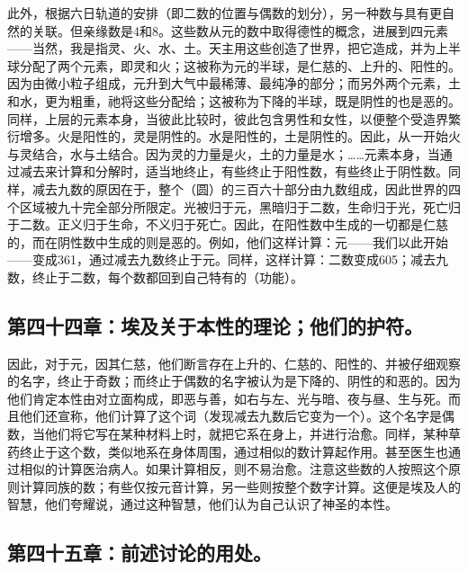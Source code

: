 此外，根据六日轨道的安排（即二数的位置与偶数的划分），另一种数与具有更自然的关联。但亲缘数是4和8。这些数从元的数中取得德性的概念，进展到四元素——当然，我是指灵、火、水、土。天主用这些创造了世界，把它造成，并为上半球分配了两个元素，即灵和火；这被称为元的半球，是仁慈的、上升的、阳性的。因为由微小粒子组成，元升到大气中最稀薄、最纯净的部分；而另外两个元素，土和水，更为粗重，祂将这些分配给；这被称为下降的半球，既是阴性的也是恶的。同样，上层的元素本身，当彼此比较时，彼此包含男性和女性，以便整个受造界繁衍增多。火是阳性的，灵是阴性的。水是阳性的，土是阴性的。因此，从一开始火与灵结合，水与土结合。因为灵的力量是火，土的力量是水；……元素本身，当通过减去来计算和分解时，适当地终止，有些终止于阳性数，有些终止于阴性数。同样，减去九数的原因在于，整个（圆）的三百六十部分由九数组成，因此世界的四个区域被九十完全部分所限定。光被归于元，黑暗归于二数，生命归于光，死亡归于二数。正义归于生命，不义归于死亡。因此，在阳性数中生成的一切都是仁慈的，而在阴性数中生成的则是恶的。例如，他们这样计算：元——我们以此开始——变成361，通过减去九数终止于元。同样，这样计算：二数变成605；减去九数，终止于二数，每个数都回到自己特有的（功能）。\par


\subsection{第四十四章：埃及关于本性的理论；他们的护符。}

因此，对于元，因其仁慈，他们断言存在上升的、仁慈的、阳性的、并被仔细观察的名字，终止于奇数；而终止于偶数的名字被认为是下降的、阴性的和恶的。因为他们肯定本性由对立面构成，即恶与善，如右与左、光与暗、夜与昼、生与死。而且他们还宣称，他们计算了这个词（发现减去九数后它变为一个）。这个名字是偶数，当他们将它写在某种材料上时，就把它系在身上，并进行治愈。同样，某种草药终止于这个数，类似地系在身体周围，通过相似的数计算起作用。甚至医生也通过相似的计算医治病人。如果计算相反，则不易治愈。注意这些数的人按照这个原则计算同族的数；有些仅按元音计算，另一些则按整个数字计算。这便是埃及人的智慧，他们夸耀说，通过这种智慧，他们认为自己认识了神圣的本性。\par


\subsection{第四十五章：前述讨论的用处。}

